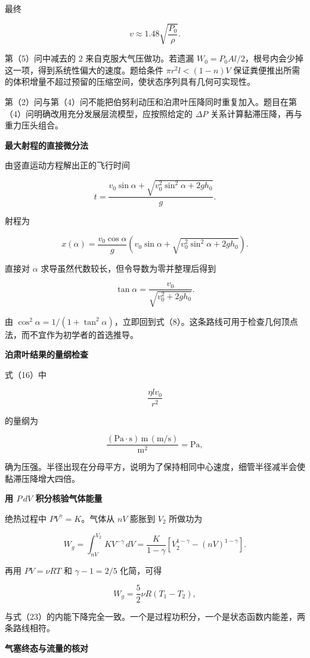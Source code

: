 \documentclass[12pt,a4paper,UTF8]{ctexart}
\begin{document}
最终

\[
\boxed{v\approx1.48\sqrt{\frac{P_0}{\rho}}}.
\tag{28}
\]

第（5）问中减去的 \(2\) 来自克服大气压做功。若遗漏
\(W_0=P_0Al/2\)，根号内会少掉这一项，得到系统性偏大的速度。题给条件
\(\pi r^2l<(1-n)V\)
保证粪便推出所需的体积增量不超过预留的压缩空间，使状态序列具有几何可实现性。

第（2）问与第（4）问不能把伯努利动压和泊肃叶压降同时重复加入。题目在第（4）问明确改用充分发展层流模型，应按照给定的
\(\Delta P\) 关系计算黏滞压降，再与重力压头组合。

\textbf{最大射程的直接微分法}

由竖直运动方程解出正的飞行时间

\[
t=\frac{v_0\sin\alpha+
\sqrt{v_0^2\sin^2\alpha+2gh_0}}{g}.
\]

射程为

\[
x(\alpha)=\frac{v_0\cos\alpha}{g}
\left(v_0\sin\alpha+
\sqrt{v_0^2\sin^2\alpha+2gh_0}\right).
\]

直接对 \(\alpha\) 求导虽然代数较长，但令导数为零并整理后得到

\[
\tan\alpha=\frac{v_0}{\sqrt{v_0^2+2gh_0}}.
\]

由
\(\cos^2\alpha=1/(1+\tan^2\alpha)\)，立即回到式（8）。这条路线可用于检查几何顶点法，而不宜作为初学者的首选推导。

\textbf{泊肃叶结果的量纲检查}

式（16）中

\[
\frac{\eta lv_0}{r^2}
\]

的量纲为

\[
\frac{(\mathrm{Pa\cdot s})\,\mathrm m\,(\mathrm{m/s})}{\mathrm{m^2}}
=\mathrm{Pa},
\]

确为压强。半径出现在分母平方，说明为了保持相同中心速度，细管半径减半会使黏滞压降增大四倍。

\textbf{用 \(P\,dV\) 积分核验气体能量}

绝热过程中 \(PV^\gamma=K\)。气体从 \(nV\) 膨胀到 \(V_2\) 所做功为

\[
W_g=\int_{nV}^{V_2}K V^{-\gamma}\,dV
=\frac{K}{1-\gamma}
\left[V_2^{1-\gamma}-(nV)^{1-\gamma}\right].
\]

再用 \(PV=\nu RT\) 和 \(\gamma-1=2/5\) 化简，可得

\[
W_g=\frac52\nu R(T_1-T_2),
\]

与式（23）的内能下降完全一致。一个是过程功积分，一个是状态函数内能差，两条路线相符。

\textbf{气塞终态与流量的核对}
\end{document}
